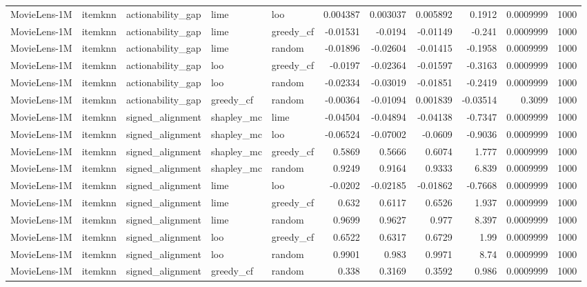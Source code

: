 \begin{table}[t]
\begin{tabular}{lllllrrrrrr}
MovieLens-1M & itemknn & actionability\_gap & lime & loo & 0.004387 & 0.003037 & 0.005892 & 0.1912 & 0.0009999 & 1000 \\
MovieLens-1M & itemknn & actionability\_gap & lime & greedy\_cf & -0.01531 & -0.0194 & -0.01149 & -0.241 & 0.0009999 & 1000 \\
MovieLens-1M & itemknn & actionability\_gap & lime & random & -0.01896 & -0.02604 & -0.01415 & -0.1958 & 0.0009999 & 1000 \\
MovieLens-1M & itemknn & actionability\_gap & loo & greedy\_cf & -0.0197 & -0.02364 & -0.01597 & -0.3163 & 0.0009999 & 1000 \\
MovieLens-1M & itemknn & actionability\_gap & loo & random & -0.02334 & -0.03019 & -0.01851 & -0.2419 & 0.0009999 & 1000 \\
MovieLens-1M & itemknn & actionability\_gap & greedy\_cf & random & -0.00364 & -0.01094 & 0.001839 & -0.03514 & 0.3099 & 1000 \\
MovieLens-1M & itemknn & signed\_alignment & shapley\_mc & lime & -0.04504 & -0.04894 & -0.04138 & -0.7347 & 0.0009999 & 1000 \\
MovieLens-1M & itemknn & signed\_alignment & shapley\_mc & loo & -0.06524 & -0.07002 & -0.0609 & -0.9036 & 0.0009999 & 1000 \\
MovieLens-1M & itemknn & signed\_alignment & shapley\_mc & greedy\_cf & 0.5869 & 0.5666 & 0.6074 & 1.777 & 0.0009999 & 1000 \\
MovieLens-1M & itemknn & signed\_alignment & shapley\_mc & random & 0.9249 & 0.9164 & 0.9333 & 6.839 & 0.0009999 & 1000 \\
MovieLens-1M & itemknn & signed\_alignment & lime & loo & -0.0202 & -0.02185 & -0.01862 & -0.7668 & 0.0009999 & 1000 \\
MovieLens-1M & itemknn & signed\_alignment & lime & greedy\_cf & 0.632 & 0.6117 & 0.6526 & 1.937 & 0.0009999 & 1000 \\
MovieLens-1M & itemknn & signed\_alignment & lime & random & 0.9699 & 0.9627 & 0.977 & 8.397 & 0.0009999 & 1000 \\
MovieLens-1M & itemknn & signed\_alignment & loo & greedy\_cf & 0.6522 & 0.6317 & 0.6729 & 1.99 & 0.0009999 & 1000 \\
MovieLens-1M & itemknn & signed\_alignment & loo & random & 0.9901 & 0.983 & 0.9971 & 8.74 & 0.0009999 & 1000 \\
MovieLens-1M & itemknn & signed\_alignment & greedy\_cf & random & 0.338 & 0.3169 & 0.3592 & 0.986 & 0.0009999 & 1000 \\

\end{tabular}
\end{table}
